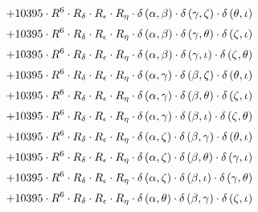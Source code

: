 \begin{subequations}
\begin{gather}
 \\[0.2em] \notag 		 + 10395 \cdot R^{6} \cdot R_{\delta{}} \cdot R_{\epsilon{}} \cdot R_{\eta{}} \cdot \delta{}\left(\alpha{}, \beta{}\right) \cdot \delta{}\left(\gamma{}, \zeta{}\right) \cdot \delta{}\left(\theta{}, \iota{}\right) 
 \\[0.2em] \notag 		 + 10395 \cdot R^{6} \cdot R_{\delta{}} \cdot R_{\epsilon{}} \cdot R_{\eta{}} \cdot \delta{}\left(\alpha{}, \beta{}\right) \cdot \delta{}\left(\gamma{}, \theta{}\right) \cdot \delta{}\left(\zeta{}, \iota{}\right) 
 \\[0.2em] \notag 		 + 10395 \cdot R^{6} \cdot R_{\delta{}} \cdot R_{\epsilon{}} \cdot R_{\eta{}} \cdot \delta{}\left(\alpha{}, \beta{}\right) \cdot \delta{}\left(\gamma{}, \iota{}\right) \cdot \delta{}\left(\zeta{}, \theta{}\right) 
 \\[0.2em] \notag 		 + 10395 \cdot R^{6} \cdot R_{\delta{}} \cdot R_{\epsilon{}} \cdot R_{\eta{}} \cdot \delta{}\left(\alpha{}, \gamma{}\right) \cdot \delta{}\left(\beta{}, \zeta{}\right) \cdot \delta{}\left(\theta{}, \iota{}\right) 
 \\[0.2em] \notag 		 + 10395 \cdot R^{6} \cdot R_{\delta{}} \cdot R_{\epsilon{}} \cdot R_{\eta{}} \cdot \delta{}\left(\alpha{}, \gamma{}\right) \cdot \delta{}\left(\beta{}, \theta{}\right) \cdot \delta{}\left(\zeta{}, \iota{}\right) 
 \\[0.2em] \notag 		 + 10395 \cdot R^{6} \cdot R_{\delta{}} \cdot R_{\epsilon{}} \cdot R_{\eta{}} \cdot \delta{}\left(\alpha{}, \gamma{}\right) \cdot \delta{}\left(\beta{}, \iota{}\right) \cdot \delta{}\left(\zeta{}, \theta{}\right) 
 \\[0.2em] \notag 		 + 10395 \cdot R^{6} \cdot R_{\delta{}} \cdot R_{\epsilon{}} \cdot R_{\eta{}} \cdot \delta{}\left(\alpha{}, \zeta{}\right) \cdot \delta{}\left(\beta{}, \gamma{}\right) \cdot \delta{}\left(\theta{}, \iota{}\right) 
 \\[0.2em] \notag 		 + 10395 \cdot R^{6} \cdot R_{\delta{}} \cdot R_{\epsilon{}} \cdot R_{\eta{}} \cdot \delta{}\left(\alpha{}, \zeta{}\right) \cdot \delta{}\left(\beta{}, \theta{}\right) \cdot \delta{}\left(\gamma{}, \iota{}\right) 
 \\[0.2em] \notag 		 + 10395 \cdot R^{6} \cdot R_{\delta{}} \cdot R_{\epsilon{}} \cdot R_{\eta{}} \cdot \delta{}\left(\alpha{}, \zeta{}\right) \cdot \delta{}\left(\beta{}, \iota{}\right) \cdot \delta{}\left(\gamma{}, \theta{}\right) 
 \\[0.2em] \notag 		 + 10395 \cdot R^{6} \cdot R_{\delta{}} \cdot R_{\epsilon{}} \cdot R_{\eta{}} \cdot \delta{}\left(\alpha{}, \theta{}\right) \cdot \delta{}\left(\beta{}, \gamma{}\right) \cdot \delta{}\left(\zeta{}, \iota{}\right) 

\end{gather}
\end{subequations}
